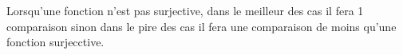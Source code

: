 \begin{enumerate}[1)]
\begin{framed}
Lorsqu'une fonction n'est pas surjective, dans le meilleur des cas il fera 1 comparaison sinon dans le pire des cas il fera une comparaison de moins qu'une fonction surjecctive.
\end{framed}


\end{enumerate}

 \newpage